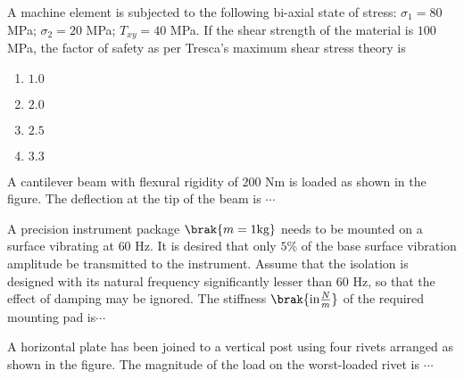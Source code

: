 \iffalse
                       
                        
                        
                        
                    
                        \author{AI24BTECH11006 - Bugada Roopansha}
                        \section{ME}
                        \chapter{2015}
                        \fi
 
    \item A machine element is subjected to the following bi-axial state of stress: $\sigma_1 = 80$ MPa; $\sigma_2 = 20$ MPa; $T_{xy} = 40$ MPa. If the shear strength of the material is $100$ MPa, the factor of safety as per Tresca's maximum shear stress theory is
    \begin{enumerate}
        \item $1.0$
        \item $2.0$
        \item $2.5$
        \item $3.3$
    \end{enumerate} 


    \item A cantilever beam with flexural rigidity of $200$ Nm is loaded as shown in the figure. The deflection  at the tip of the beam is $\cdots$



 \item A precision instrument package $\brak{m = 1 \text{kg}}$ needs to be mounted on a surface vibrating at $60$ Hz. It is desired that only $5\%$ of the base surface vibration amplitude be transmitted to the instrument. Assume that the isolation is designed with its natural frequency significantly lesser than $60$ Hz, so that the effect of damping may be ignored. The stiffness $\brak{\text{in}\frac{N}{m}}$ of the required mounting pad is$\cdots$

\item A horizontal plate has been joined to a vertical post using four rivets arranged as shown in the figure. The magnitude of the load on the worst-loaded rivet  is $\cdots$

